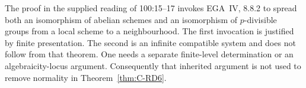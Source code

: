 \begin{remark}
The proof in the supplied reading of 100:15--17 invokes EGA~IV, 8.8.2
to spread both an isomorphism of abelian schemes and an isomorphism of
$p$-divisible groups from a local scheme to a neighbourhood. The first
invocation is justified by finite presentation. The second is an
infinite compatible system and does not follow from that theorem.
One needs a separate finite-level determination or an algebraicity-locus
argument. Consequently that inherited argument is not used to remove
normality in Theorem~\ref{thm:C-RD6}.
\end{remark}
